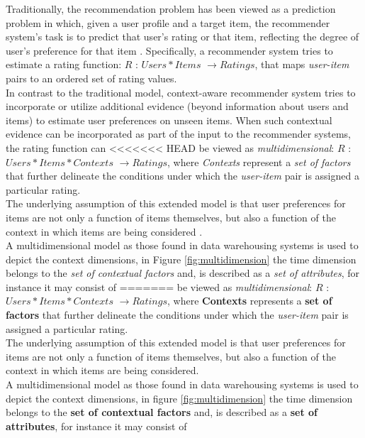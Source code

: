 Traditionally, the recommendation problem has been viewed as a
prediction problem in which, given a user profile and a target item,
the recommender system's task is to predict that user's rating or that
item, reflecting the degree of user's preference for that 
item  \cite{jannach2010recommender}. Specifically, a recommender 
system tries to estimate a rating function: 
$R$ : $Users * Items$ $ \rightarrow Ratings$,  
that maps \textit{user-item} pairs to an ordered  set of rating values.\\
In contrast to the traditional model, context-aware recommender system
tries to incorporate or utilize additional evidence (beyond
information about users and items) to estimate user preferences on
unseen items. When such contextual evidence can be incorporated as
part of the input to the recommender systems, the rating function can
<<<<<<< HEAD
be viewed as \textit{multidimensional}:  $R$ : $Users * Items *
Contexts$ $ \rightarrow Ratings$, where \textit{Contexts} represent a
\textit{set of factors} that further delineate the conditions under which the
\textit{user-item} pair is assigned a particular rating. \\ 
The underlying assumption of this extended model is that 
user preferences for items are not only a function of items 
themselves, but also a  function of the context in which 
items are being considered  \cite{lim2009assessing}. \\
A multidimensional model as those found in data 
warehousing systems  \cite{kimball2011data} is
used to depict the context dimensions, 
in Figure \ref{fig:multidimension}  the time dimension belongs 
to the \textit{set of contextual factors} and, is described as a 
 \textit{set of attributes}, for instance it may consist of
=======
be viewed as \textit{multidimensional}: $R$ : $Users * Items *
Contexts$ $ \rightarrow Ratings$, where \textbf{Contexts} represents a
\textbf{set of factors} that further delineate the conditions under which the
\textit{user-item} pair is assigned a particular rating. \\ The
underlying assumption of this extended model is that user preferences
for items are not only a function of items themselves, but also a
function of the context in which items are being
considered\cite{lim2009assessing}. \\
A multidimensional model as those found in data warehousing 
systems\cite{kimball2011data} is
used to depict the context dimensions, in figure
\ref{fig:multidimension} the time dimension belongs to the \textbf{set of 
contextual factors} and, is described as a \textbf{set of
attributes}, for instance it may consist of
